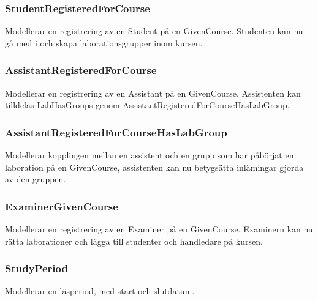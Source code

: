 \subsubsection{StudentRegisteredForCourse}
Modellerar en registrering av en Student på en GivenCourse. Studenten kan nu gå med i och skapa  laborationsgrupper inom kursen.

\subsubsection{AssistantRegisteredForCourse}
Modellerar en registrering av en Assistant på en GivenCourse. Assistenten kan tilldelas LabHasGroups genom AssistantRegisteredForCourseHasLabGroup.

\subsubsection{AssistantRegisteredForCourseHasLabGroup}
Modellerar kopplingen mellan en assistent och en grupp som har påbörjat en laboration på en GivenCourse, assistenten kan nu betygsätta inlämingar gjorda av den gruppen. 

\subsubsection{ExaminerGivenCourse}
Modellerar en registrering av en Examiner på en GivenCourse. Examinern kan nu rätta laborationer och lägga till studenter och handledare på kursen.

\subsubsection{StudyPeriod}
Modellerar en läsperiod, med start och slutdatum.
